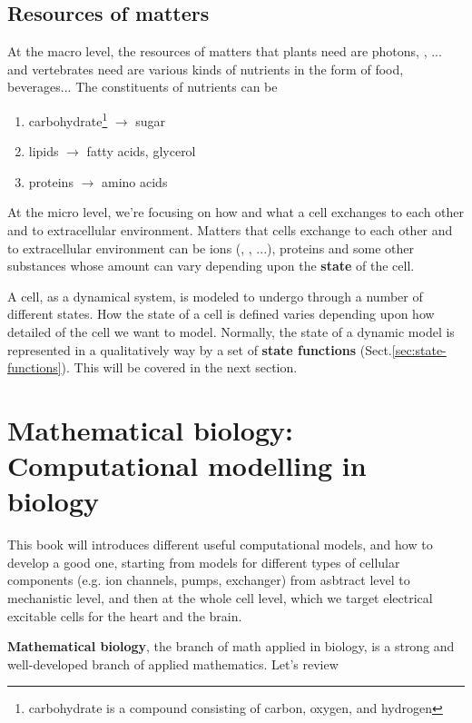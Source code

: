 \subsection{Resources of matters}
\label{sec:resources-matters}

At the macro level, the resources of matters that plants need are
photons, , ... and vertebrates need are various kinds
of nutrients in the form of food, beverages...  The constituents of
nutrients can be
\begin{enumerate}
\item
  carbohydrate\footnote{carbohydrate is a compound consisting of
    carbon, oxygen, and hydrogen} $\rightarrow$ sugar
\item lipids $\rightarrow$ fatty acids, glycerol
\item proteins $\rightarrow$ amino acids
\end{enumerate}


At the micro level, we're focusing on how and what a cell exchanges to
each other and to extracellular environment. Matters that cells
exchange to each other and to extracellular environment can be ions
(, , ...), proteins and some other substances
whose amount can vary depending upon the {\bf state} of the cell.

A cell, as a dynamical system, is modeled to undergo through a number of
different states. How the state of a cell is defined varies depending upon how
detailed of the cell we want to model. Normally, the state of a dynamic model is
represented in a qualitatively way by a set of {\bf state functions}
(Sect.\ref{sec:state-functions}).
This will be covered in the next section. %

\section{Mathematical biology: Computational modelling in biology}
\label{sec:comp-modell-biol}

This book will introduces different useful computational models, and how to
develop a good one, starting from models for different types of cellular
components (e.g. ion channels, pumps, exchanger) from asbtract level to mechanistic level,
and then at the whole cell level, which we target electrical excitable cells for
the heart and the brain.

{\bf Mathematical biology}, the branch of math applied in biology, is
a strong and well-developed branch of applied mathematics.  Let's
review


